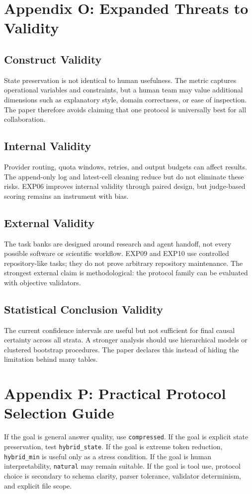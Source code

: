 \documentclass[11pt]{article}
\begin{document}
\section{Appendix O: Expanded Threats to Validity}
\subsection{Construct Validity}
State preservation is not identical to human usefulness. The metric captures operational variables and constraints, but a human team may value additional dimensions such as explanatory style, domain correctness, or ease of inspection. The paper therefore avoids claiming that one protocol is universally best for all collaboration.

\subsection{Internal Validity}
Provider routing, quota windows, retries, and output budgets can affect results. The append-only log and latest-cell cleaning reduce but do not eliminate these risks. EXP06 improves internal validity through paired design, but judge-based scoring remains an instrument with bias.

\subsection{External Validity}
The task banks are designed around research and agent handoff, not every possible software or scientific workflow. EXP09 and EXP10 use controlled repository-like tasks; they do not prove arbitrary repository maintenance. The strongest external claim is methodological: the protocol family can be evaluated with objective validators.

\subsection{Statistical Conclusion Validity}
The current confidence intervals are useful but not sufficient for final causal certainty across all strata. A stronger analysis should use hierarchical models or clustered bootstrap procedures. The paper declares this instead of hiding the limitation behind many tables.

\section{Appendix P: Practical Protocol Selection Guide}
If the goal is general answer quality, use \texttt{compressed}. If the goal is explicit state preservation, test \texttt{hybrid\_state}. If the goal is extreme token reduction, \texttt{hybrid\_min} is useful only as a stress condition. If the goal is human interpretability, \texttt{natural} may remain suitable. If the goal is tool use, protocol choice is secondary to schema clarity, parser tolerance, validator determinism, and explicit file scope.
\end{document}

